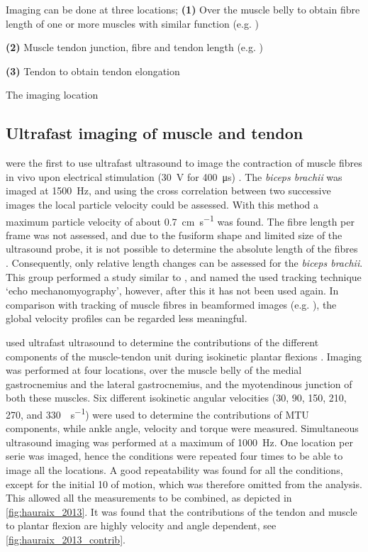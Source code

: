 Imaging can be done at three locations; \textbf{(1)} Over the muscle belly to obtain fibre length of one or more muscles with similar function (e.g. \cite{klint_afferent_2009, cronin_triceps_2015}) 

\textbf{(2)} Muscle tendon junction, fibre and tendon length (e.g. \cite{klint_afferent_2009})

\textbf{(3)} Tendon to obtain tendon elongation 

The imaging location 

\subsection{Ultrafast imaging of muscle and tendon}

\citeauthor{deffieux_ultrafast_2006} were the first to use ultrafast ultrasound to image the contraction of muscle fibres in vivo upon electrical stimulation (\SI{30}{\volt} for \SI{400}{\micro\second}) \cite{deffieux_ultrafast_2006}. The \textit{biceps brachii} was imaged at \SI{1500}{\hertz}, and using the cross correlation between two successive images the local particle velocity could be assessed. With this method a maximum particle velocity of about \SI{0.7}{\centi\meter\per\second} was found. The fibre length per frame was not assessed, and due to the fusiform shape and limited size of the ultrasound probe, it is not possible to determine the absolute length of the fibres \cite{hodges_measurement_2003}. Consequently, only relative length changes can be assessed for the \textit{biceps brachii}. This group performed a study similar to \cite{deffieux_ultrafast_2006}, and named the used tracking technique `echo mechanomyography', however, after this it has not been used again. In comparison with tracking of muscle fibres in beamformed images (e.g. \cite{farris_ultratrack_2016}), the global velocity profiles can be regarded less meaningful. 


\citeauthor{hauraix_shortening_2013} used ultrafast ultrasound to determine the contributions of the different components of the muscle-tendon unit during isokinetic plantar flexions \cite{hauraix_shortening_2013}. Imaging was performed at four locations, over the muscle belly of the medial gastrocnemius and the lateral gastrocnemius, and the myotendinous junction of both these muscles. Six different isokinetic angular velocities (30, 90, 150, 210, 270, and \SI{330}{\deg\per\second}) were used to determine the contributions of MTU components, while ankle angle, velocity and torque were measured. Simultaneous ultrasound imaging was performed at a maximum of \SI{1000}{\hertz}. One location per serie was imaged, hence the conditions were repeated four times to be able to image all the locations. A good repeatability was found for all the conditions, except for the initial \SI{10}{\deg} of motion, which was therefore omitted from the analysis. This allowed all the measurements to be combined, as depicted in \autoref{fig:hauraix_2013}. It was found that the contributions of the tendon and muscle to plantar flexion are highly velocity and angle dependent, see \autoref{fig:hauraix_2013_contrib}. 


